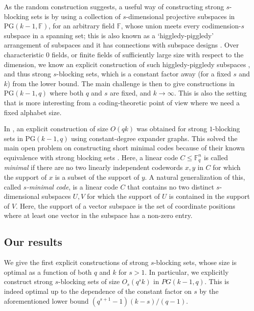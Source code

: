 \documentclass[11pt]{article}
\theoremstyle{plain}
\theoremstyle{definition}
\begin{document}
As the random construction suggests, a useful way of constructing strong $s$-blocking sets is by using a collection of $s$-dimensional projective subspaces in $\mathrm{PG}(k - 1, \mathbb{F})$, for an arbitrary field $\mathbb{F}$, whose union meets every codimension-$s$ subspace in a spanning set; this is also known as a `higgledy-piggledy' arrangement of subspaces \cite{fancsali2016higgledy} and it has connections with subspace designs \cite{guruswami2016explicit}. 
Over characteristic $0$ fields, or finite fields of sufficiently large size with respect to the dimension, we know an explicit construction of such higgledy-piggledy subspaces \cite{fancsali2016higgledy}, and thus strong $s$-blocking sets, which is a constant factor away (for a fixed $s$ and $k$) from the lower bound. 
The main challenge is then to give constructions in $\mathrm{PG}(k - 1, q)$ where both $q$ and $s$ are fixed, and $k \rightarrow \infty$. This is also the setting that is more interesting from a coding-theoretic point of view where we need a fixed alphabet size. 

In \cite{alon2024strong}, an explicit construction of size $O(q k)$ was obtained for strong $1$-blocking sets in $\mathrm{PG}(k - 1, q)$ using constant-degree expander graphs. 
This solved the main open problem on constructing short minimal codes because of their known equivalence with strong blocking sets \cite{alfarano2022geometric, tang2021full}. 
Here, a linear code $C \leq \mathbb{F}_q^n$ is called \emph{minimal} if there are no two linearly independent codewords $x, y$ in $C$ for which the support of $x$ is a  subset of the support of $y$. 
A natural generalization of this, called \emph{$s$-minimal code}, is a linear code $C$ that contains no two distinct $s$-dimensional subspaces $U, V$ for which the support of $U$ is contained in the support of $V$. Here, the support of a vector subspace is the set of coordinate positions where at least one vector in the subspace has a non-zero entry. 

\subsection{Our results}

We give the first explicit constructions of strong $s$-blocking sets, whose size is optimal as a function of both $q$ and $k$ for $s > 1$. In particular, we explicitly construct  strong $s$-blocking sets of size $O_s(q^s k)$ in $PG(k-1,q)$. This is indeed optimal up to the dependence of the constant factor on $s$ by the aforementioned lower bound $(q^{s+1}-1)(k-s)/(q-1)$. 
\end{document}
